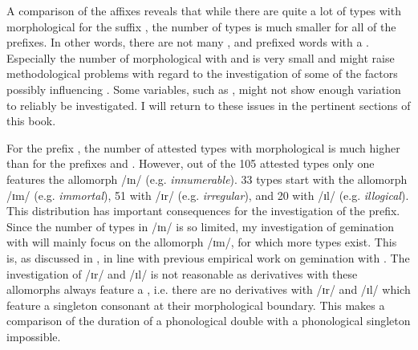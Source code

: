 A comparison of the affixes reveals that while there are quite a lot of types with morphological  for the suffix , the number of types is much smaller for all of the prefixes. In other words, there are not many ,  and prefixed words with a . Especially the number of morphological  with  and  is very small and might raise methodological problems with regard to the investigation of some of the factors possibly influencing . Some variables, such as , might not show enough variation to reliably be investigated. I will return to these issues in the pertinent sections of this book.

For the prefix , the number of attested types with morphological  is much higher than for the prefixes  and . However, out of the 105 attested types only one features the allomorph /ɪn/ (e.g. \textit{innumerable}). 33 types start with the allomorph /ɪm/ (e.g. \textit{immortal}), 51 with /ɪr/ (e.g. \textit{irregular}), and 20 with /ɪl/ (e.g. \textit{illogical}). 
This distribution has important consequences for the investigation of the prefix. Since the number of types in /ɪn/ is so limited, my investigation of gemination with  will mainly focus on the allomorph /ɪm/, for which more types exist. This is, as discussed in , in line with previous empirical work on gemination with .
The investigation of /ɪr/  and /ɪl/ is not reasonable as derivatives with these allomorphs always feature a , i.e. there are no derivatives with /ɪr/  and /ɪl/ which feature a singleton consonant at their morphological boundary. This makes a comparison of the duration of a phonological double with a phonological singleton impossible.
